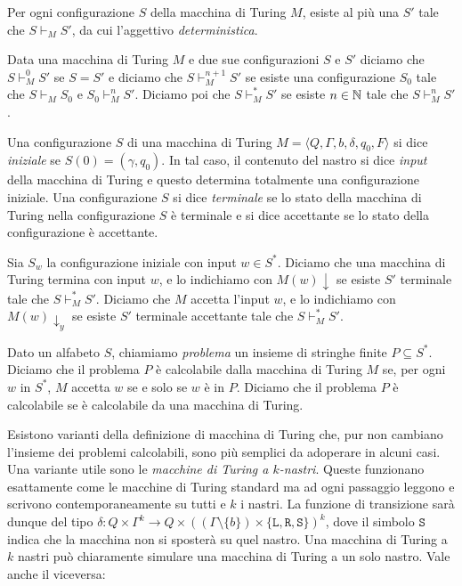\begin{osservazione}
 Per ogni configurazione $S$ della macchina di Turing $M$, esiste al più una
 $S'$ tale che $S \vdash_M S'$, da cui l'aggettivo \emph{deterministica}.
\end{osservazione}

\begin{definizione}
 Data una macchina di Turing $M$ e due sue configurazioni $S$ e $S'$ diciamo
 che $S \vdash_M^{0} S'$ se $S = S'$ e diciamo che
 $S \vdash_M^{n+1} S'$ se esiste una configurazione $S_0$ tale che
 $S \vdash_M S_0$ e $S_0 \vdash_M^{n} S'$. Diciamo poi che $S \vdash_M^{\ast} S'$
 se esiste $n \in \mathbb{N}$ tale che $S \vdash_M^{n} S'$.
\end{definizione}

\begin{definizione}
 Una configurazione $S$ di una macchina di Turing
 $M=\langle Q, \Gamma, b, \delta, q_0, F \rangle$ si dice \emph{iniziale} se
 $S(0) = (\gamma, q_0)$. In tal caso, il contenuto del nastro
 si dice \emph{input} della macchina di Turing e questo determina totalmente
 una configurazione iniziale.
 Una configurazione $S$ si dice \emph{terminale} se lo stato della macchina
 di Turing nella configurazione $S$ è terminale e si dice accettante se lo stato
 della configurazione è accettante.
\end{definizione}

\begin{definizione}
 Sia $S_w$ la configurazione iniziale con input $w \in S^\ast$. Diciamo che
 una macchina di Turing termina con input $w$, e lo indichiamo con $M(w)\downarrow$
 se esiste $S'$ terminale tale che $S \vdash_M^\ast S'$. Diciamo che
 $M$ accetta l'input $w$, e lo indichiamo con $M(w)\downarrow_y$ se
 esiste $S'$ terminale accettante tale che $S \vdash_M^\ast S'$.
\end{definizione}

\begin{definizione}
 Dato un alfabeto $S$, chiamiamo \emph{problema} un insieme di stringhe finite
 $P \subseteq S^\ast$. Diciamo che il problema $P$ è calcolabile dalla macchina
 di Turing $M$ se, per ogni $w$ in $S^\ast$, $M$ accetta $w$ se e solo se $w$
 è in $P$. Diciamo che il problema $P$ è calcolabile se è calcolabile da una
 macchina di Turing.
\end{definizione}

Esistono varianti della definizione di macchina di Turing che, pur non cambiano
l'insieme dei problemi calcolabili, sono più semplici da adoperare in alcuni
casi. Una variante utile sono le
\emph{macchine di Turing a $k$-nastri}. Queste funzionano esattamente come le
macchine di Turing standard ma ad ogni passaggio leggono e scrivono contemporaneamente su
tutti e $k$ i nastri. La funzione di transizione sarà dunque del tipo
$\delta:  Q \times \Gamma^k \to Q \times ((\Gamma \setminus \{b\}) \times \{\texttt{L},\texttt{R},\texttt{S}\})^k$,
dove il simbolo $\texttt{S}$ indica che la macchina non si sposterà su quel nastro.
Una macchina di Turing a $k$ nastri può chiaramente simulare una macchina di Turing
a un solo nastro. Vale anche il viceversa:


